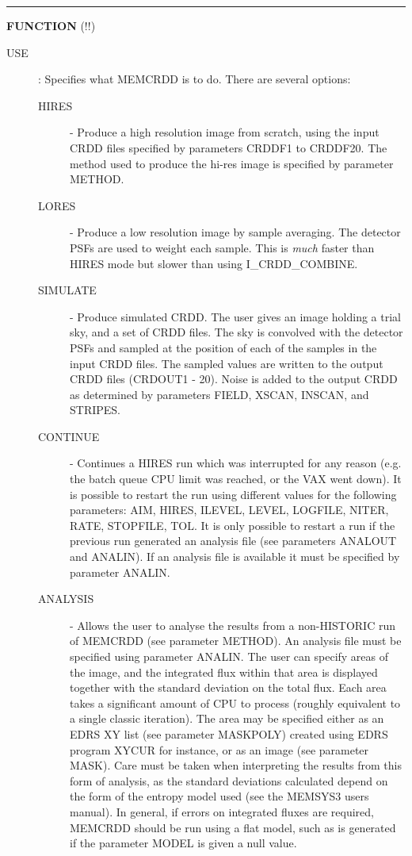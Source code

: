 \rule{\textwidth}{0.3mm}
{\Large {\bf FUNCTION} (!!)}
\begin{description}
\item [USE]:
Specifies what MEMCRDD is to do. There are several options:
\begin{description}
\item [HIRES] - Produce a high resolution image from scratch, using the
input CRDD files specified by parameters CRDDF1 to CRDDF20.
The method used to produce the hi-res image is specified by parameter METHOD.
\item [LORES] - Produce a low resolution image by sample averaging. The detector
PSFs are used to weight each sample. This is {\em much} faster than HIRES mode
but slower than using I\_CRDD\_COMBINE.
\item [SIMULATE] - Produce simulated CRDD. The user gives an image holding a
trial sky, and a set of CRDD files. The sky is convolved with the detector
PSFs and sampled at the position of each of the samples in the input CRDD files.
The sampled values are written to the output CRDD files (CRDOUT1 - 20). Noise
is added to the output CRDD as determined by parameters FIELD, XSCAN, INSCAN,
and STRIPES.
\item [CONTINUE] - Continues a HIRES run which was interrupted for any reason
(e.g. the batch queue CPU limit was reached, or the VAX went down). It is
possible to restart the run using different values for the following parameters:
AIM, HIRES, ILEVEL, LEVEL, LOGFILE, NITER, RATE, STOPFILE, TOL. It is
only possible to restart a run if the previous run generated an analysis file
(see parameters ANALOUT and ANALIN). If an analysis file is available it must be
specified by parameter ANALIN.
\item [ANALYSIS] - Allows the user to analyse the results from a non-HISTORIC run
of MEMCRDD (see parameter METHOD). An analysis file must be specified using
parameter ANALIN. The user can specify areas of the image, and the integrated
flux within that area is displayed together with the standard deviation on the
total flux. Each area takes a significant amount of CPU to process (roughly
equivalent to a single classic iteration). The area may be specified either as
an EDRS XY list (see parameter MASKPOLY) created using EDRS program XYCUR
for instance, or as an image (see parameter MASK). Care must be taken when
interpreting the results from this form of analysis, as the standard deviations
calculated depend on the form of the entropy model used (see the MEMSYS3 users
manual). In general, if errors on integrated fluxes are required, MEMCRDD should
be run using a flat model, such as is generated if the parameter MODEL is given
a null value.


\end{description}
\end{description}
